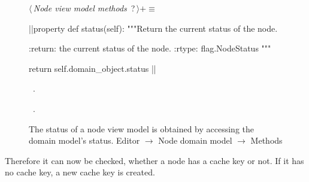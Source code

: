 \documentclass[%
    a4paper,    %
    justified,  %
    nobib,      %
    openany     %
]{tufte-book}
\makeatletter
\renewcommand{\label}[1]{\@tufte@label{##1}}%
\makeatother
\begin{document}
\begin{figure}
\begin{flushleft} \small
\begin{minipage}{\linewidth}\label{scrap77}\raggedright\small
{} $\langle\,${\itshape Node view model methods}\nobreak\ {\footnotesize {?}}$\,\rangle+\equiv$
\vspace{-1ex}
\begin{pythoncode}
|\normalfont{}\fontfamily{}|property
def status(self):
    """Return the current status of the node.

    :return: the current status of the node.
    :rtype: flag.NodeStatus
    """

    return self.domain_object.status
|\NWsep|
\end{pythoncode}
\vspace{1.5ex}
\footnotesize
\begin{list}{}{\setlength{\itemsep}{-\parsep}\setlength{\itemindent}{-\leftmargin}}
\item \NWtxtMacroDefBy\ .
\item \NWtxtMacroRefIn\ .

\item{}
\end{list}
\end{minipage}\vspace{4ex}
\end{flushleft}
\caption{The status of a node view model is obtained by accessing the domain
  model's status.
  \newline{}\newline{}Editor $\rightarrow$ Node domain model $\rightarrow$
  Methods}
\label{editor:lst:node-view-model:methods:status}
\end{figure}

Therefore it can now be checked, whether a node has a cache key or not. If it
has no cache key, a new cache key is created.
\end{document}
